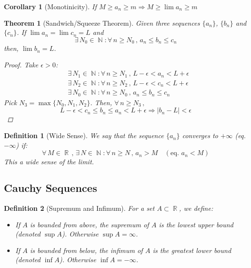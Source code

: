 \documentclass[12pt]{article}
\let\RA\Rightarrow
\newcommand{\Forall}[1]{\forall\,{#1}\,,\,}
\newcommand{\Exist}[1]{\exists\,{#1}:}
\DeclareMathOperator{\N}{\mathbb{N}}
\DeclareMathOperator{\R}{\mathbb{R}}
\newtheorem{theorem}{Theorem}[subsection]
\newtheorem{definition}{Definition}[subsection]
\newtheorem{corollary}{Corollary}[subsection]
\begin{document}
\begin{corollary}[Monotinicity]
  If $M\geq a_n\geq m\RA M\geq \lim a_n\geq m$
\end{corollary}

\begin{theorem}[Sandwich/Squeeze Theorem]
  Given three sequences $\{a_n\}$, $\{b_n\}$ and $\{c_n\}$. If $\lim a_n =\lim c_n = L$ and $$\Exist{N_0\in\N}\Forall{n\geq N_0}a_n\leq b_n\leq c_n$$
  then, $\lim b_n = L$.
  \begin{proof}
    Take $\epsilon>0$:
    \begin{align*}
      &\Exist{N_1\in\N}\Forall{n\geq N_1}L-\epsilon<a_n<L+\epsilon\\
      &\Exist{N_2\in\N}\Forall{n\geq N_2}L-\epsilon<c_n<L+\epsilon\\
      &\Exist{N_0\in\N}\Forall{n\geq N_0}a_n\leq b_n\leq c_n
    \end{align*}
    Pick $N_3=\max\{N_0,N_1,N_2\}$. Then, $\Forall{n\geq N_3}$ $$L-\epsilon < c_n \leq b_n \leq a_n < L+\epsilon \RA |b_n -L |< \epsilon$$
  \end{proof}
\end{theorem}

\begin{definition}[Wide Sense]
  We say that the sequence $\{a_n\}$ converges to $+\infty$ (eq. $-\infty$) if:
  $$\Forall{M\in\R}\Exist{N\in\N}\Forall{n\geq N} a_n>M\quad(\text{eq. } a_n < M)$$
  This a wide sense of the limit.
\end{definition}

\pagebreak

\subsection{Cauchy Sequences}

\begin{definition}[Supremum and Infimum]
  For a set $A\subset\R$, we define:
  \begin{itemize}
    \item[] If $A$ is bounded from above, the supremum of $A$ is the lowest upper bound (denoted $\sup A$). Otherwise $\sup A=\infty$.
    \item[] If $A$ is bounded from below, the infimum of $A$ is the greatest lower bound (denoted $\inf A$). Otherwise $\inf A=-\infty$.
  \end{itemize}
\end{definition}
\end{document}
